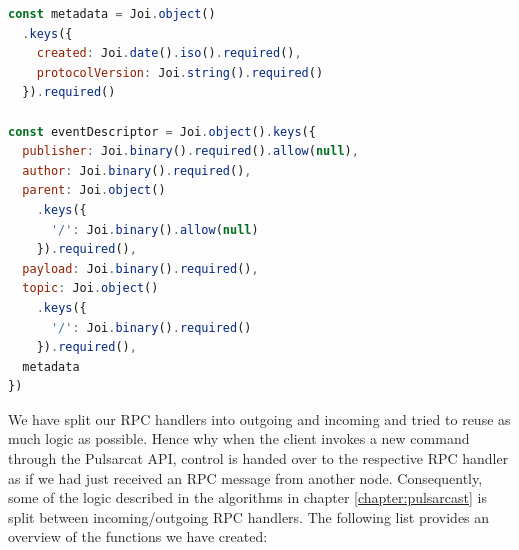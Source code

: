 \begin{lstlisting}[language=JavaScript, float=h, caption={Joi schema for and event descriptor},label={joi-schema-event-descriptor}]
const metadata = Joi.object()
  .keys({
    created: Joi.date().iso().required(),
    protocolVersion: Joi.string().required()
  }).required()

const eventDescriptor = Joi.object().keys({
  publisher: Joi.binary().required().allow(null),
  author: Joi.binary().required(),
  parent: Joi.object()
    .keys({
      '/': Joi.binary().allow(null)
    }).required(),
  payload: Joi.binary().required(),
  topic: Joi.object()
    .keys({
      '/': Joi.binary().required()
    }).required(),
  metadata
})
\end{lstlisting}

We have split our RPC handlers into outgoing and incoming and tried to reuse as
much logic as possible. Hence why when the client invokes a new command through
the Pulsarcat API, control is handed over to the respective RPC handler as if
we had just received an RPC message from another node. Consequently, some of
the logic described in the algorithms in chapter \ref{chapter:pulsarcast} is
split between incoming/outgoing RPC handlers. The following list provides an
overview of the functions we have created:

